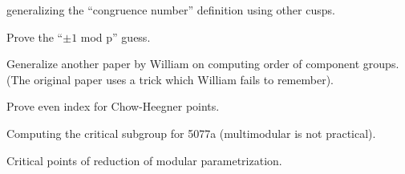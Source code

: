 \documentclass [11pt, proquest] {uwthesis}[2015/03/03]
\begin{document}
generalizing the ``congruence number'' definition using other cusps.  

Prove the ``$\pm 1$ mod p'' guess. 

Generalize another paper by William on computing order of component groups. (The original paper uses a trick which 
William fails to remember). 

Prove even index for Chow-Heegner points. 

Computing the critical subgroup for 5077a (multimodular is not practical). 

Critical points of reduction of modular parametrization. 


\nocite{*}


\end{document}
